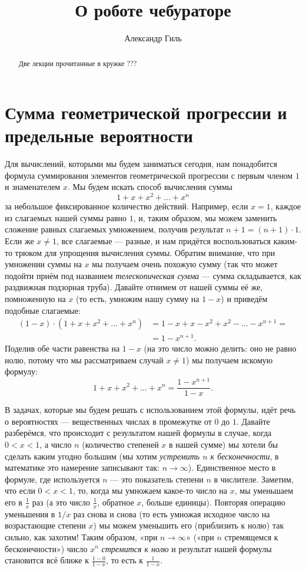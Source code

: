 \documentclass{article}
\begin{document}
\title{О роботе чебураторе}
\author{Александр Гиль}
\date{}
\maketitle
\begin{abstract}
Две лекции прочитанные в кружке ??? 
\end{abstract}

\section{Сумма геометрической прогрессии и предельные вероятности}

Для вычислений, которыми мы будем заниматься сегодня, 
нам понадобится формула суммирования элементов геометрической прогрессии с первым членом $1$ и знаменателем $x$. 
Мы будем искать способ вычисления суммы 
\[1+x+x^2+\dots+x^n\] 
за небольшое фиксированное количество действий. 
Например, если $x=1$, каждое из  слагаемых нашей суммы равно $1$, 
и, 
таким образом, 
мы можем заменить сложение  равных слагаемых умножением, получив результат $n+1=(n+1)\cdot 1$. 
Если же $x\ne 1$, 
все слагаемые --- разные, и нам придётся воспользоваться каким-то трюком для упрощения вычисления суммы. 
Обратим внимание, что при умножении суммы на $x$ мы получаем очень похожую сумму 
(так что может подойти приём под названием \emph{телескопическая сумма} --- сумма складывается, как раздвижная подзорная труба). 
Давайте отнимем от нашей суммы её же, помноженную на $x$ 
(то есть, умножим нашу сумму на $1-x$) 
и приведём подобные слагаемые: 
\begin{align*}
 (1-x)\cdot(1+x+x^2+\dots+x^n)&=1-x+x-x^2+x^2-\dots-x^{n+1}=
 \\
 &=1-x^{n+1}.
\end{align*}
Поделив обе части равенства на $1-x$ 
(на это число можно делить: 
оно не равно нолю, потому что мы рассматриваем случай $x\ne1$) 
мы получаем искомую формулу:
\[1+x+x^2+\dots+x^n=\frac{1-x^{n+1}}{1-x}.\]

В задачах, которые мы будем решать с использованием этой формулы, идёт речь о вероятностях --- вещественных числах в промежутке от $0$ до $1$. Давайте разберёмся, что происходит с результатом нашей формулы в случае, когда $0<x<1$, 
а число $n$ (количество степеней $x$ в нашей сумме) 
мы хотели бы сделать каким угодно большим 
(мы хотим \emph{устремить $n$ к бесконечности}, 
в математике это намерение записывают так: $n\to\infty$). 
Единственное место в формуле, где используется $n$ --- это показатель степени $n$ в числителе. 
Заметим, что если $0<x<1$, 
то, когда мы умножаем какое-то число на $x$, 
мы уменьшаем его в $\tfrac1x$ раз 
(а это число $\tfrac1x$, обратное $x$, больше единицы). 
Повторяя операцию уменьшения в $1/x$ раз снова и снова (то есть умножая исходное число на возрастающие степени $x$) мы можем уменьшить его (приблизить к нолю) так сильно, как захотим! 
Таким образом, «при $n\to\infty$» («при $n$ стремящемся к бесконечности») число $x^n$ \emph{стремится к нолю} и результат нашей формулы становится всё ближе к $\tfrac{1-0}{1-x}$, то есть к $\tfrac{1}{1-x}$. 
\end{document}
